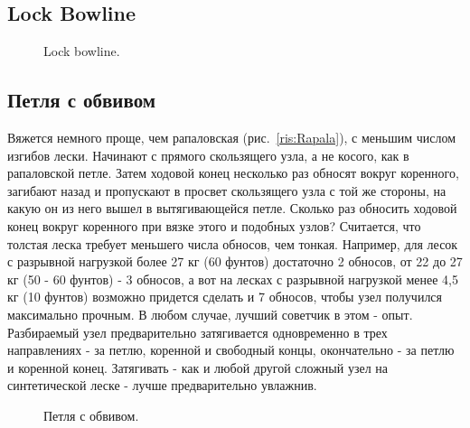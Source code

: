 \subsection{Lock Bowline}

\begin{figure}[H]\centering
	\begin{minipage}{1\linewidth}
		\begin{center}
			\tcbox[enhanced jigsaw,colframe=black,opacityframe=0.5,opacityback=0.5]
			{\centering{}}
		\end{center}
	\end{minipage}
\caption{Lock bowline.}
\label{ris:Lock_bowline}
\end{figure}

\subsection{Петля с обвивом}

Вяжется немного проще, чем рапаловская (рис.~\ref{ris:Rapala}), с меньшим числом изгибов лески. Начинают с прямого скользящего узла, а не косого, как в рапаловской петле. Затем ходовой конец несколько раз обносят вокруг коренного, загибают назад и пропускают в просвет скользящего узла с той же стороны, на какую он из него вышел в вытягивающейся петле. Сколько раз обносить ходовой конец вокруг коренного при вязке этого и подобных узлов? Считается, что толстая леска требует меньшего числа обносов, чем тонкая. Например, для лесок с разрывной нагрузкой более 27 кг (60 фунтов) достаточно 2 обносов, от 22 до 27 кг (50 - 60 фунтов) - 3 обносов, а вот на лесках с разрывной нагрузкой менее 4,5 кг (10 фунтов) возможно придется сделать и 7 обносов, чтобы узел получился максимально прочным. В любом случае, лучший советчик в этом - опыт. Разбираемый узел предварительно затягивается одновременно в трех направлениях - за петлю, коренной и свободный концы, окончательно - за петлю и коренной конец. Затягивать - как и любой другой сложный узел на синтетической леске - лучше предварительно увлажнив.


\begin{figure}[H]\centering
	\begin{minipage}{1\linewidth}
		\begin{center}
			\tcbox[enhanced jigsaw,colframe=black,opacityframe=0.5,opacityback=0.5]
			{\centering{}}
		\end{center}
	\end{minipage}
\caption{Петля с обвивом.}
\label{ris:Petlya_s_obvivom}
\end{figure}


